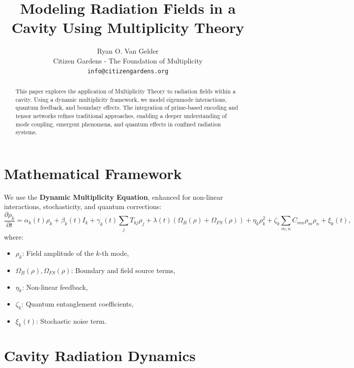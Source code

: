 \documentclass{article}
\theoremstyle{plain}
\begin{document}
\title{Modeling Radiation Fields in a Cavity Using Multiplicity Theory}

\author{Ryan O. Van Gelder \\
Citizen Gardens - The Foundation of Multiplicity \\
\texttt{info@citizengardens.org}}
\maketitle
\begin{abstract}
This paper explores the application of Multiplicity Theory to radiation fields within a cavity. Using a dynamic multiplicity framework, we model eigenmode interactions, quantum feedback, and boundary effects. The integration of prime-based encoding and tensor networks refines traditional approaches, enabling a deeper understanding of mode coupling, emergent phenomena, and quantum effects in confined radiation systems.
\end{abstract}

\section{Mathematical Framework}
We use the \textbf{Dynamic Multiplicity Equation}, enhanced for non-linear interactions, stochasticity, and quantum corrections:
\begin{equation}
    \frac{\partial \rho_k}{\partial t} = \alpha_k(t)\rho_k + \beta_k(t)I_k + \gamma_k(t) \sum_j T_{kj}\rho_j 
    + \lambda(t)\left(\Omega_B(\rho) + \Omega_{FS}(\rho)\right) 
    + \eta_k \rho_k^2 + \zeta_k \sum_{m,n} C_{mn} \rho_m \rho_n + \xi_k(t),
\end{equation}
where:
\begin{itemize}
    \item $\rho_k$: Field amplitude of the $k$-th mode,
    \item $\Omega_B(\rho), \Omega_{FS}(\rho)$: Boundary and field source terms,
    \item $\eta_k$: Non-linear feedback,
    \item $\zeta_k$: Quantum entanglement coefficients,
    \item $\xi_k(t)$: Stochastic noise term.
\end{itemize}

\section{Cavity Radiation Dynamics}
\end{document}

